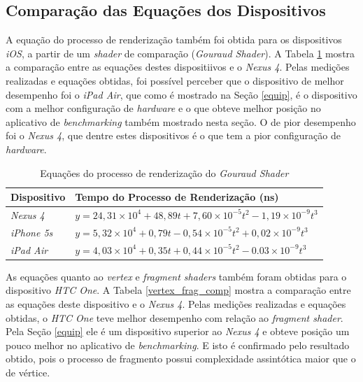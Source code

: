 \subsection{Comparação das Equações dos Dispositivos}

	A equação do processo de renderização também foi obtida para os dispositivos \textit{iOS}, a partir de um \textit{shader} de comparação (\textit{Gouraud Shader}). A Tabela \ref{render_time_comp} mostra a comparação entre as equações destes dispositiivos e o \textit{Nexus 4}. Pelas medições realizadas e equações obtidas, foi possível perceber que o dispositivo de melhor desempenho foi o \textit{iPad Air}, que como é mostrado na Seção \ref{equip}, é o dispositivo com a melhor configuração de \textit{hardware} e o que obteve melhor posição no aplicativo de \textit{benchmarking} também mostrado nesta seção. O de pior desempenho foi o \textit{Nexus 4}, que dentre estes dispositivos é o que tem a pior configuração de \textit{hardware}.

	\begin{table}[ht]
	\centering	
	\begin{tabularx}{0.9\textwidth}{lX}
		\toprule
		\textbf{Dispositivo} & \textbf{Tempo do Processo de Renderização (ns)}  \\
		\midrule
		\textit{Nexus 4} &  $y = 24,31 \times 10^4 + 48,89t + 7,60 \times 10^{-5}t^2 - 1,19 \times 10^{-9}t^3$\\
		\textit{iPhone 5s} &   $y = 5,32 \times 10^4 + 0,79t - 0,54 \times 10^{-5}t^2 + 0,02 \times 10^{-9}t^3$\\
		\textit{iPad Air} & $y = 4,03 \times 10^4 + 0,35t + 0,44 \times 10^{-5}t^2 - 0.03 \times 10^{-9}t^3$\\	
		\bottomrule
	\end{tabularx}
	\caption{Equações do processo de renderização do \textit{Gouraud Shader}}
	\label{render_time_comp}
	\end{table}

	As equações quanto ao \textit{vertex} e \textit{fragment shaders} também foram obtidas para o dispositivo \textit{HTC One}. A Tabela \ref{vertex_frag_comp} mostra a comparação entre as equações deste dispositivo e o \textit{Nexus 4}. Pelas medições realizadas e equações obtidas, o \textit{HTC One} teve melhor desempenho com relação ao \textit{fragment shader}. Pela Seção \ref{equip} ele é um dispositivo superior ao \textit{Nexus 4} e obteve posição um pouco melhor no aplicativo de \textit{benchmarking}.  E isto é confirmado pelo resultado obtido, pois o processo de fragmento possui complexidade assintótica maior que o de vértice. 

